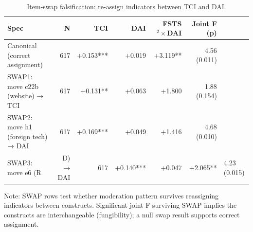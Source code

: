 \begin{table}[ht]
\centering
\caption{Item-swap falsification: re-assign indicators between TCI and DAI.}
\label{tab:item_swap}
\begin{tabular}{lrrrrr}
\toprule
Spec & N & TCI & DAI & FSTS$^2\times$DAI & Joint F (p) \\
\midrule
Canonical (correct assignment) & 617 & +0.153*** & +0.019 & +3.119** & 4.56 (0.011) \\
SWAP1: move c22b (website) → TCI & 617 & +0.131** & +0.063 & +1.800 & 1.88 (0.154) \\
SWAP2: move h1 (foreign tech) → DAI & 617 & +0.169*** & +0.049 & +1.416 & 4.68 (0.010) \\
SWAP3: move e6 (R&D) → DAI & 617 & +0.140*** & +0.047 & +2.065** & 4.23 (0.015) \\
\bottomrule
\end{tabular}
\par\smallskip
\footnotesize Note: SWAP rows test whether moderation pattern survives reassigning indicators between constructs. Significant joint F surviving SWAP implies the constructs are interchangeable (fungibility); a null swap result supports correct assignment.
\end{table}